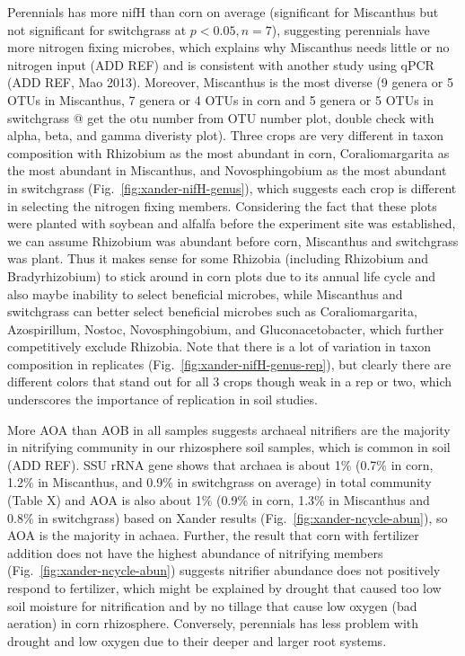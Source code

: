 \documentclass[12pt]{article}
\begin{document}
Perennials has more nifH than corn on average (significant for Miscanthus but not significant for switchgrass at $p < 0.05, n = 7$), suggesting perennials have more nitrogen fixing microbes, which explains why Miscanthus needs little or no nitrogen input (ADD REF) and is consistent with another study using qPCR (ADD REF, Mao 2013). Moreover, Miscanthus is the most diverse (9 genera or 5 OTUs in Miscanthus, 7 genera or 4 OTUs in corn and 5 genera or 5 OTUs in switchgrass @ get the otu number from OTU number plot, double check with alpha, beta, and gamma diveristy plot). Three crops are very different in taxon composition with Rhizobium as the most abundant in corn, Coraliomargarita as the most abundant in Miscanthus, and Novosphingobium as the most abundant in switchgrass (Fig.~\ref{fig:xander-nifH-genus}), which suggests each crop is different in selecting the nitrogen fixing members. Considering the fact that these plots were planted with soybean and alfalfa before the experiment site was established, we can assume Rhizobium was abundant before corn, Miscanthus and switchgrass was plant. Thus it makes sense for some Rhizobia (including Rhizobium and Bradyrhizobium) to stick around in corn plots due to its annual life cycle and also maybe inability to select beneficial microbes, while Miscanthus and switchgrass can better select beneficial microbes such as Coraliomargarita, Azospirillum, Nostoc, Novosphingobium, and Gluconacetobacter, which further competitively exclude Rhizobia. Note that there is a lot of variation in taxon composition in replicates (Fig.~\ref{fig:xander-nifH-genus-rep}), but clearly there are different colors that stand out for all 3 crops though weak in a rep or two, which underscores the importance of replication in soil studies.

More AOA than AOB in all samples suggests archaeal nitrifiers are the majority in nitrifying community in our rhizosphere soil samples, which is common in soil (ADD REF). SSU rRNA gene shows that archaea is about 1\% (0.7\% in corn, 1.2\% in Miscanthus, and 0.9\% in switchgrass on average) in total community (Table X) and AOA is also about 1\% (0.9\% in corn, 1.3\% in Miscanthus and 0.8\% in switchgrass) based on Xander results (Fig.~\ref{fig:xander-ncycle-abun}), so AOA is the majority in achaea. Further, the result that corn with fertilizer addition does not have the highest abundance of nitrifying members (Fig.~\ref{fig:xander-ncycle-abun}) suggests nitrifier abundance does not positively respond to fertilizer, which might be explained by drought that caused too low soil moisture for nitrification and by no tillage that cause low oxygen (bad aeration) in corn rhizosphere. Conversely, perennials has less problem with drought and low oxygen due to their deeper and larger root systems.
\end{document}
